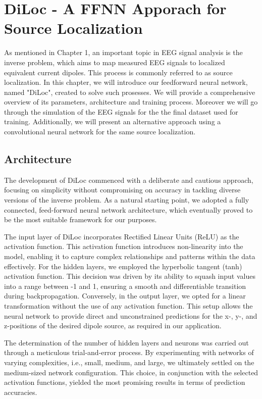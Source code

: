 \documentclass[a4paper, UKenglish, 11pt]{uiomaster}
\begin{document}
\chapter{DiLoc - A FFNN Apporach for Source Localization}
As mentioned in Chapter 1, an important topic in EEG signal analysis is the inverse problem, which aims to map measured EEG signals to localized equivalent current dipoles. This process is commonly referred to as source localization. In this chapter, we will introduce our feedforward neural network, named "DiLoc", created to solve such prosesses. We will provide a comprehensive overview of its parameters, architecture and training process. Moreover we will go through the simulation of the EEG signals for the the final dataset used for training. Additionally, we will present an alternative approach using a convolutional neural network for the same source localization.

\section{Architecture}
The development of DiLoc commenced with a deliberate and cautious approach, focusing on simplicity without compromising on accuracy in tackling diverse versions of the inverse problem. As a natural starting point, we adopted a fully connected, feed-forward neural network architecture, which eventually proved to be the most suitable framework for our purposes.

The input layer of DiLoc incorporates Rectified Linear Units (ReLU) as the activation function. This activation function introduces non-linearity into the model, enabling it to capture complex relationships and patterns within the data effectively. For the hidden layers, we employed the hyperbolic tangent (tanh) activation function. This decision was driven by its ability to squash input values into a range between -1 and 1, ensuring a smooth and differentiable transition during backpropagation. Conversely, in the output layer, we opted for a linear transformation without the use of any activation function. This setup allows the neural network to provide direct and unconstrained predictions for the x-, y-, and z-positions of the desired dipole source, as required in our application.

The determination of the number of hidden layers and neurons was carried out through a meticulous trial-and-error process. By experimenting with networks of varying complexities, i.e., small, medium, and large, we ultimately settled on the medium-sized network configuration. This choice, in conjunction with the selected activation functions, yielded the most promising results in terms of prediction accuracies.
\end{document}
